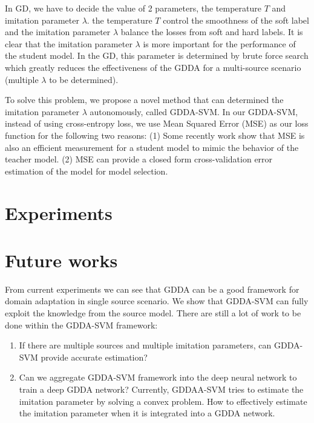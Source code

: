 \documentclass[11pt,onecolumn]{article}
\begin{document}
In GD, we have to decide the value of 2 parameters, the temperature $T$ and imitation parameter $\lambda$. the temperature $T$ control the smoothness of the soft label and the imitation parameter $\lambda$ balance the losses from soft and hard labels. It is clear that the imitation parameter $\lambda$ is more important for the performance of the student model. In the GD, this parameter is determined by brute force search which greatly reduces the effectiveness of the GDDA for a multi-source scenario (multiple $\lambda$ to be determined).

To solve this problem, we propose a novel method that can determined the imitation parameter $\lambda$ autonomously, called GDDA-SVM. In our GDDA-SVM, instead of using cross-entropy loss, we use Mean Squared Error (MSE) as our loss function for the following two reasons: (1) Some recently work \cite{ba2014deep} \cite{luo2016face} \cite{romero2014fitnets} \cite{urban2016deep} show that MSE is also an efficient measurement for a student model to mimic the behavior of the teacher model. (2) MSE can provide a closed form cross-validation error estimation of the model for model selection. 

%


\section{Experiments}


\section{Future works}
From current experiments we can see that GDDA can be a good framework for domain adaptation in single source scenario. We show that GDDA-SVM can fully exploit the knowledge from the source model. There are still a lot of work to be done within the GDDA-SVM framework:
\begin{enumerate}
\item If there are multiple sources and multiple imitation parameters, can GDDA-SVM provide accurate estimation?
\item Can we aggregate GDDA-SVM framework into the deep neural network to train a deep GDDA network? Currently, GDDAA-SVM tries to estimate the imitation parameter by solving a convex problem. How to effectively estimate the imitation parameter when it is integrated into a GDDA network. 
\end{enumerate}


\end{document}
